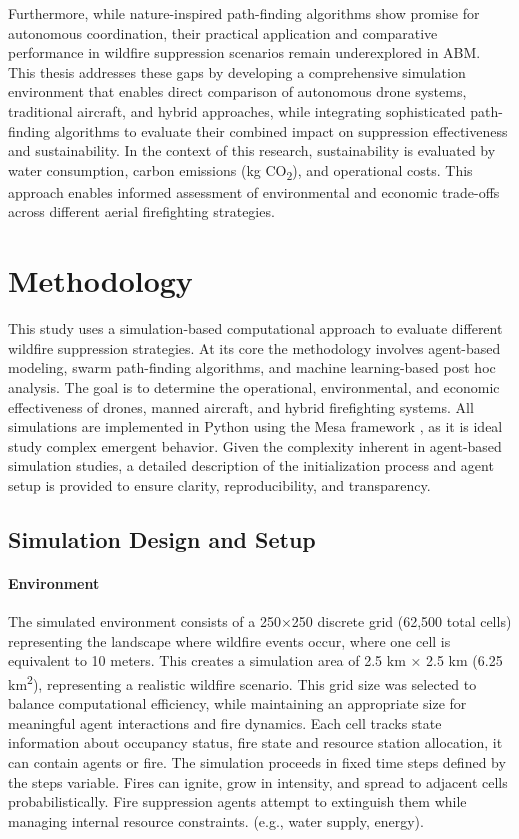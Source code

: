 \documentclass[11pt, a4paper]{article}
\begin{document}
Furthermore, while nature-inspired path-finding algorithms show promise for autonomous coordination, their practical application and comparative performance in wildfire suppression scenarios remain underexplored in ABM. This thesis addresses these gaps by developing a comprehensive simulation environment that enables direct comparison of autonomous drone systems, traditional aircraft, and hybrid approaches, while integrating sophisticated path-finding algorithms to evaluate their combined impact on suppression effectiveness and sustainability.
In the context of this research, sustainability is evaluated by water consumption, carbon emissions (kg CO\textsubscript{2}), and operational costs. This approach enables informed assessment of environmental and economic trade-offs across different aerial firefighting strategies.

\section{Methodology}
\label{sec:Methodology}

This study uses a simulation-based computational approach to evaluate different wildfire suppression strategies. At its core the methodology involves agent-based modeling, swarm path-finding algorithms, and machine learning-based post hoc analysis. The goal is to determine the operational, environmental, and economic effectiveness of drones, manned aircraft, and hybrid firefighting systems. All simulations are implemented in Python using the Mesa framework \citep{terMesa}, as it is ideal study complex emergent behavior. Given the complexity inherent in agent-based simulation studies, a detailed description of the initialization process and agent setup is provided to ensure clarity, reproducibility, and transparency.

\subsection{Simulation Design and Setup}
\paragraph{Environment} The simulated environment consists of a 250×250 discrete grid (62,500 total cells) representing the landscape where wildfire events occur, where one cell is equivalent to 10 meters. This creates a simulation area of 2.5 km × 2.5 km (6.25 km\textsuperscript{2}), representing a realistic wildfire scenario. This grid size was selected to balance computational efficiency, while maintaining an appropriate size for meaningful agent interactions and fire dynamics. Each cell tracks state information about occupancy status, fire state and resource station allocation, it can contain agents or fire. The simulation proceeds in fixed time steps defined by the steps variable. Fires can ignite, grow in intensity, and spread to adjacent cells probabilistically. Fire suppression agents attempt to extinguish them while managing internal resource constraints. (e.g., water supply, energy). 
\end{document}
